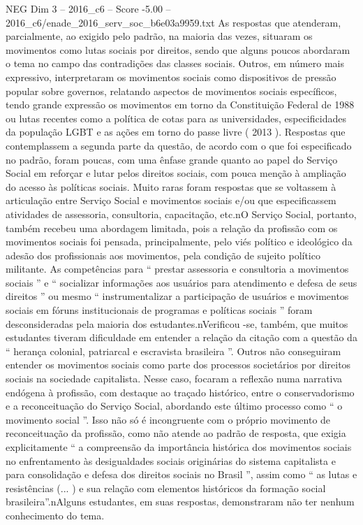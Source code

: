 \begin{textsample}{NEG Dim 3 – 2016\_c6 – Score -5.00 – 2016\_c6/enade\_2016\_serv\_soc\_b6e03a9959.txt}
As respostas que atenderam, parcialmente, ao exigido pelo padrão, na maioria das vezes, situaram os movimentos como lutas sociais por direitos, sendo que alguns poucos abordaram o tema no campo das contradições das classes sociais.
Outros, em número mais expressivo, interpretaram os movimentos sociais como dispositivos de pressão popular sobre governos, relatando aspectos de movimentos sociais específicos, tendo grande expressão os movimentos em torno da Constituição Federal de 1988 ou lutas recentes como a política de cotas para as universidades, especificidades da população LGBT e as ações em torno do passe livre ( 2013 ).
Respostas que contemplassem a segunda parte da questão, de acordo com o que foi especificado no padrão, foram poucas, com uma ênfase grande quanto ao papel do Serviço Social em reforçar e lutar pelos direitos sociais, com pouca menção à ampliação do acesso às políticas sociais.
Muito raras foram respostas que se voltassem à articulação entre Serviço Social e movimentos sociais e/ou que especificassem atividades de assessoria, consultoria, capacitação, etc.nO Serviço Social, portanto, também recebeu uma abordagem limitada, pois a relação da profissão com os movimentos sociais foi pensada, principalmente, pelo viés político e ideológico da adesão dos profissionais aos movimentos, pela condição de sujeito político militante.
As competências para “ prestar assessoria e consultoria a movimentos sociais ” e “ socializar informações aos usuários para atendimento e defesa de seus direitos ” ou mesmo “ instrumentalizar a participação de usuários e movimentos sociais em fóruns institucionais de programas e políticas sociais ” foram desconsideradas pela maioria dos estudantes.nVerificou -se, também, que muitos estudantes tiveram dificuldade em entender a relação da citação com a questão da “ herança colonial, patriarcal e escravista brasileira ”.
Outros não conseguiram entender os movimentos sociais como parte dos processos societários por direitos sociais na sociedade capitalista.
Nesse caso, focaram a reflexão numa narrativa endógena à profissão, com destaque ao traçado histórico, entre o conservadorismo e a reconceituação do Serviço Social, abordando este último processo como “ o movimento social ”.
Isso não só é incongruente com o próprio movimento de reconceituação da profissão, como não atende ao padrão de resposta, que exigia explicitamente “ a compreensão da importância histórica dos movimentos sociais no enfrentamento às desigualdades sociais originárias do sistema capitalista e para consolidação e defesa dos direitos sociais no Brasil ”, assim como “ as lutas e resistências (... ) e sua relação com elementos históricos da formação social brasileira”.nAlguns estudantes, em suas respostas, demonstraram não ter nenhum conhecimento do tema.

\end{textsample}
